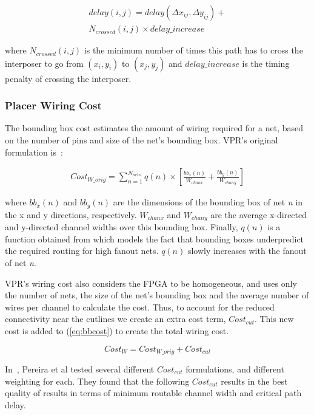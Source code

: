 \documentclass[journal]{IEEEtran}
\begin{document}
\setlength{\arraycolsep}{0.0em}
\begin{multline}
\label{eq:timing_cost}
delay(i,j) = delay(\Delta x_{ij}, \Delta y_{ij}) + \\
N_{crossed}(i,j) \times delay\_increase
\end{multline}
\setlength{\arraycolsep}{5pt}

where $N_{crossed}(i,j)$ is the minimum number of times this path has to cross the interposer to go from $(x_i,y_i)$ to $(x_j,y_j)$ and $delay\_increase$ is the timing penalty of crossing the interposer.

\subsubsection{Placer Wiring Cost}
The bounding box cost estimates the amount of wiring required for a net, based on the number of pins and size of the net's bounding box. VPR's original formulation is~\cite{betz1997vpr}:

\setlength{\arraycolsep}{0.0em}
\begin{multline}
\label{eq:bbcost}
Cost_{W\_orig} = \sum_{n=1}^{N_{nets}} q(n) \times [\frac{bb_x(n)}{W_{chanx}} + \frac{bb_y(n)}{W_{chany}}]
\end{multline}
\setlength{\arraycolsep}{5pt}


where $bb_x(n)$ and $bb_y(n)$ are the dimensions of the bounding box of net \textit{n} in the x and y directions, respectively. $W_{chanx}$ and $W_{chany}$ are the average x-directed and y-directed channel widths over this bounding box. Finally, $q(n)$ is a function obtained from \cite{icann} which models the fact that bounding boxes underpredict the required routing for high fanout nets. $q(n)$ slowly increases with the fanout of net \textit{n}.

VPR's wiring cost also considers the FPGA to be homogeneous, and uses only the number of nets, the size of the net's bounding box and the average number of wires per channel to calculate the cost. Thus, to account for the reduced connectivity near the cutlines we create an extra cost term, $Cost_{cut}$. This new cost is added to (\ref{eq:bbcost}) to create the total wiring cost.

\setlength{\arraycolsep}{0.0em}
\begin{equation}
\label{eq:total_wiring}
Cost_{W} = Cost_{W\_orig} + Cost_{cut}
\end{equation}
\setlength{\arraycolsep}{5pt}

In~\cite{interposer2014}, Pereira et al tested several different $Cost_{cut}$ formulations, and different weighting for each. They found that the following $Cost_{cut}$ results in the best quality of results in terms of minimum routable channel width and critical path delay.
\end{document}
